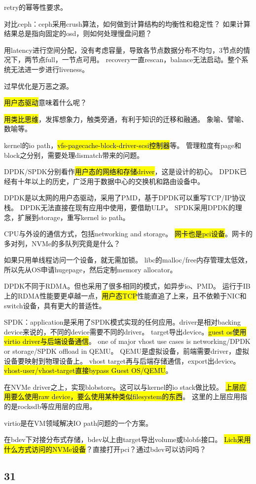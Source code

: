 retry的幂等性要求。

对比ceph：ceph采用crush算法，如何做到计算结构的均衡性和稳定性？
如果计算结果总是指向固定的osd，则如何处理慢盘问题？

用latency进行空间分配，没有考虑容量，导致各节点数据分布不均匀，3节点的情况下，两节点full，一节点可用。
recovery一直rescan，balance无法启动。整个系统无法进一步进行liveness。

过早优化是万恶之源。

\hrulefill

\hl{用户态驱动}意味着什么呢？

\hl{用类比思维}，发挥想象力，触类旁通，有利于知识的迁移和融通。
象喻、譬喻、数喻等。

kernel的io path，\hl{vfs-pagecache-block-driver-scsi控制器}等。
管理粒度有page和block之分别，需要处理dismatch带来的问题。

DPDK/SPDK分别看作\hl{用户态的网络和存储driver}，这是设计的初心。
DPDK已经有十年以上的历史，广泛用于数据中心的交换机和路由设备中。

DPDK是以太网的用户态驱动，采用了PMD，基于DPDK可以重写TCP/IP协议栈。
DPDK无法直接在现有应用中使用，要借助ULP。
SPDK采用DPDK的理念，扩展到storage，重写kernel io path。

CPU与外设的通信方式，包括networking and storage。
\hl{网卡也是pci设备}。网卡的多对列，NVMe的多队列究竟是什么？

如果只用单线程访问一个设备，就无需加锁。
libc的malloc/free内存管理太低效，所以先从OS申请hugepage，然后定制memory allocator。

DPDK不同于RDMA。但也采用了很多相同的模式，如异步io、PMD。
运行于IB上的RDMA性能要更卓越一点，\hl{用户态TCP}性能直追了上来，且不依赖于NIC和switch设备，具有更大的普适性。

SPDK：application是采用了SPDK模式实现的任何应用。driver是相对backing device来说的，不同的device需要不同的driver。
target导出device。\hl{guest os使用virtio driver与后端设备通信}。
one of major vhost use cases is networking/DPDK or storage/SPDK offload in QEMU。
QEMU是虚拟设备，前端需要driver，虚拟设备要映射到物理设备上。
vhost target再与后端存储通信，export出device。
\hl{vhost-user/vhost-target直接bypass Guest OS/QEMU}。

在NVMe driver之上，实现blobstore。这可以与kernel的io stack做比较。
\hl{上层应用要么使用raw device，要么使用某种类似filesystem的东西}。
这里的上层应用指的是rocksdb等应用层的应用。

virtio是在VM领域解决IO path问题的一个方案。

在bdev下对接分布式存储，bdev以上由target导出volume或blobfs接口。
\hl{Lich采用什么方式访问的NVMe设备}？直接打开pci？通过bdev可以访问吗？

\subsection{31}
